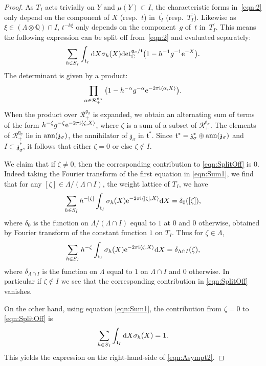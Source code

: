 \documentclass[11pt]{article}
\numberwithin{equation}{section}
\newcommand{\pair}[2]{\langle #1, #2 \rangle}
\newcommand{\tn}[1]{\textnormal{#1}}
\renewcommand{\i}{{\mathrm{i}}}
\def\g{\ensuremath{\mathfrak{g}}}
\def\z{\ensuremath{\mathfrak{z}}}
\def\t{\ensuremath{\mathfrak{t}}}
\def\R{\ensuremath{\mathcal{R}}}
\def\bC{\ensuremath{\mathbb{C}}}
\def\bQ{\ensuremath{\mathbb{Q}}}
\def\ann{\ensuremath{\tn{ann}}}
\def\de{\ensuremath{\tn{det}_\bC}}
\begin{document}
\begin{proof}As $T_I$ acts trivially on $Y$ and $\mu(Y)\subset I$, the characteristic forms in~\eqref{eqn:2} only depend on the component of $X$ (resp.~$t$) in~$\t_I^\prime$ (resp.~$T_I^\prime$). Likewise as $\xi \in (\Lambda \otimes \bQ) \cap I$, $t^{-k\xi}$ only depends on the component~$g$ of~$t$ in~$T_I^\prime$. This means the following expression can be split off from~\eqref{eqn:2} and evaluated separately:
\begin{gather}\label{eqn:SplitOff}
\sum_{h \in S_I}\int_{\t_I}{\rm d} X \sigma_h(X)\de^{\g_\sigma/\t}\big(1-h^{-1}g^{-1}{\rm e}^{-X}\big).
\end{gather}
The determinant is given by a product:
\[ \prod_{\alpha \in \R_+^{\g_\sigma}} \big(1-h^{-\alpha}g^{-\alpha}{\rm e}^{-2\pi \i \pair{\alpha}{X}}\big).\]
When the product over $\R_+^{\g_\sigma}$ is expanded, we obtain an alternating sum of terms of the form $h^{-\zeta}g^{-\zeta}{\rm e}^{-2\pi \i \pair{\zeta}{X}}$, where $\zeta$ is a sum of a subset of $\R_+^{\g_\sigma}$. The elements of $\R_+^{\g_\sigma}$ lie in $\tn{ann}(\z_\sigma)$, the annihilator of $\z_\sigma$ in $\t^\ast$. Since $\t^\ast=\z_\sigma^\ast\oplus \ann(\z_\sigma)$ and $I \subset \z_\sigma^\ast$, it follows that either $\zeta=0$ or else $\zeta \notin I$.

We claim that if $\zeta \ne 0$, then the corresponding contribution to \eqref{eqn:SplitOff} is $0$. Indeed taking the Fourier transform of the first equation in \eqref{eqn:Sum1}, we find that for any $[\zeta] \in \Lambda/(\Lambda \cap I)$, the weight lattice of $T_I$, we have
\[ \sum_{h \in S_I} h^{-[\zeta]}\int_{\t_I}\sigma_h(X){\rm e}^{-2\pi \i\pair{[\zeta]}{X}}{\rm d}X=\delta_0([\zeta]),\]
where $\delta_0$ is the function on $\Lambda/(\Lambda \cap I)$ equal to $1$ at $0$ and $0$ otherwise, obtained by Fourier transform of the constant function $1$ on $T_I$. Thus for $\zeta \in \Lambda$,
\begin{gather*}
\sum_{h \in S_I} h^{-\zeta}\int_{\t_I}\sigma_h(X){\rm e}^{-2\pi \i\pair{\zeta}{X}}{\rm d} X=\delta_{\Lambda \cap I}(\zeta),
\end{gather*}
where $\delta_{\Lambda \cap I}$ is the function on $\Lambda$ equal to $1$ on $\Lambda \cap I$ and $0$ otherwise. In particular if $\zeta \notin I$ we see that the corresponding contribution in \eqref{eqn:SplitOff} vanishes.

On the other hand, using equation \eqref{eqn:Sum1}, the contribution from $\zeta=0$ to \eqref{eqn:SplitOff} is
\[ \sum_{h \in S_I}\int_{\t_I}{\rm d} X \sigma_h(X)=1. \]
This yields the expression on the right-hand-side of \eqref{eqn:Asympt2}.
\end{proof}
\end{document}
